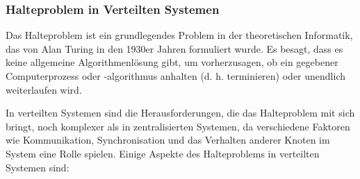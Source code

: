 \subsubsection{Halteproblem in Verteilten Systemen}

Das Halteproblem ist ein grundlegendes Problem in der theoretischen Informatik, das von Alan Turing in den 1930er Jahren formuliert wurde. Es besagt, dass es keine allgemeine Algorithmenlösung gibt, um vorherzusagen, ob ein gegebener Computerprozess oder -algorithmus anhalten (d. h. terminieren) oder unendlich weiterlaufen wird.

In verteilten Systemen sind die Herausforderungen, die das Halteproblem mit sich bringt, noch komplexer als in zentralisierten Systemen, da verschiedene Faktoren wie Kommunikation, Synchronisation und das Verhalten anderer Knoten im System eine Rolle spielen. Einige Aspekte des Halteproblems in verteilten Systemen sind:
